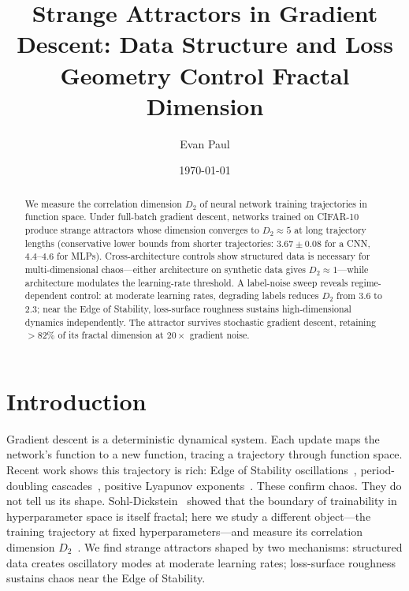 \documentclass[aps,prl,twocolumn,superscriptaddress,floatfix]{revtex4-2}
\begin{document}
\title{Strange Attractors in Gradient Descent: Data Structure and Loss Geometry Control Fractal Dimension}

\author{Evan Paul}

\date{\today}

\begin{abstract}
We measure the correlation dimension $D_2$ of neural network training trajectories in function space. Under full-batch gradient descent, networks trained on CIFAR-10 produce strange attractors whose dimension converges to $D_2 \approx 5$ at long trajectory lengths (conservative lower bounds from shorter trajectories: $3.67 \pm 0.08$ for a CNN, $4.4$--$4.6$ for MLPs). Cross-architecture controls show structured data is necessary for multi-dimensional chaos---either architecture on synthetic data gives $D_2 \approx 1$---while architecture modulates the learning-rate threshold. A label-noise sweep reveals regime-dependent control: at moderate learning rates, degrading labels reduces $D_2$ from $3.6$ to $2.3$; near the Edge of Stability, loss-surface roughness sustains high-dimensional dynamics independently. The attractor survives stochastic gradient descent, retaining $>$82\% of its fractal dimension at $20\times$ gradient noise.
\end{abstract}

\maketitle

\section{Introduction}

Gradient descent is a deterministic dynamical system. Each update maps the network's function to a new function, tracing a trajectory through function space. Recent work shows this trajectory is rich: Edge of Stability oscillations~\cite{cohen2021,damian2023}, period-doubling cascades~\cite{kalra2025,ghosh2025}, positive Lyapunov exponents~\cite{morales2024,storm2024}. These confirm chaos. They do not tell us its shape. Sohl-Dickstein~\cite{sohldickstein2024} showed that the boundary of trainability in hyperparameter space is itself fractal; here we study a different object---the training trajectory at fixed hyperparameters---and measure its correlation dimension $D_2$~\cite{grassberger1983}. We find strange attractors shaped by two mechanisms: structured data creates oscillatory modes at moderate learning rates; loss-surface roughness sustains chaos near the Edge of Stability.
\end{document}
